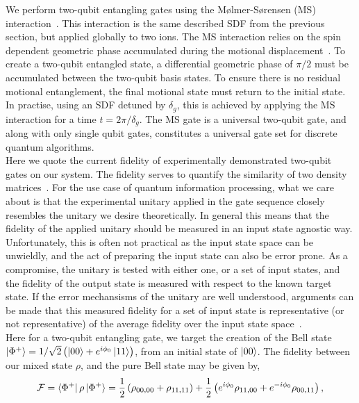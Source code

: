     We perform two-qubit entangling gates using the Mølmer-Sørensen (MS)
    interaction~\cite{}. This interaction is the same described SDF from the
    previous section, but applied globally to two ions. The MS interaction
    relies on the spin dependent geometric phase accumulated during the motional
    displacement~\cite{ozeri_tutorial_2011}. To create a two-qubit entangled state, a differential
    geometric phase of $\pi/2$ must be accumulated between the two-qubit basis
    states. To ensure there is no residual motional entanglement, the final
    motional state must return to the initial state. In practise, using an SDF
    detuned by $\delta_g$, this is achieved by applying the MS interaction for a
    time $t = 2\pi/\delta_g$. The MS gate is a universal two-qubit gate, and
    along with only single qubit gates, constitutes a universal gate set for
    discrete quantum algorithms.\\  
    Here we quote the current fidelity of experimentally demonstrated two-qubit gates on
    our system. The fidelity serves to quantify the similarity of
    two density matrices~\cite{}.  For the use case of quantum information processing, what we
    care about is that the experimental unitary applied in the gate sequence closely resembles the unitary we desire theoretically. In general this
    means that the fidelity of the applied unitary should be measured in an input
    state agnostic way. Unfortunately, this is often not practical as the input
    state space can be unwieldly, and the act of preparing the input state can
    also be error prone. As a compromise, the unitary is tested with either
    one, or a set of input states, and the fidelity of the output state
    is measured with respect to the known target state. If the error mechansisms of the 
    unitary are well understood, arguments can be made that this measured
    fidelity for a set of input state is representative (or not representative)
    of the average fidelity over the input state space~\cite{}.\\
    Here for a two-qubit entangling gate, we target the creation of the Bell
    state $\ket{\Phi^+} = 1/\sqrt{2} \left( \ket{00} +
    e^{i\phi_0}\ket{11} \right)$, from an initial state of $\ket{00}$.
    The fidelity between our mixed state $\rho$, and the pure Bell state may be
    given by,
    \begin{equation}
        \mathcal{F} = \bra{\Phi^+} \rho \ket{\Phi^+} = \frac{1}{2} \left( \rho_{00,00} + \rho_{11,11} \right) + \frac{1}{2}\left( e^{i\phi_0}\rho_{11,00}+e^{-i\phi_0}\rho_{00,11}\right),
        \label{eq:Fidelity}
    \end{equation}
